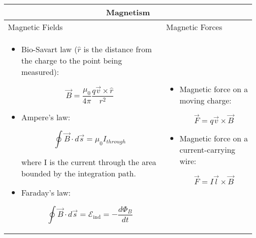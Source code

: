 \documentclass{article}
\begin{document}
\begin{center}

	\begin{longtable}{|p{9cm}|p{9cm}|}

		\hline

		\multicolumn{2}{|c|}{Magnetism}                                                                           \\

		\hline



		Magnetic Fields & Magnetic Forces                                                                         \\



		\begin{itemize}

			\item Bio-Savart law ($ \hat{r}$ is the distance from the charge to the point being measured):

			      \[ \vec{B} = \frac{\mu_0}{4\pi} \frac{q\vec{v} \times \hat{r}}{r^2} \]

			\item Ampere's law:

			      \[ \oint \vec{B} \cdot d \vec{s} = \mu_0 I_{through} \]

			      where I is the current through the area bounded by the integration path.



			\item Faraday's law:



			      \[ \oint \vec B \cdot d \vec s = \mathcal{E}_\text{ind} = - \frac{d \Phi_B}{dt} \]

		\end{itemize}



		                &



		\begin{itemize}

			\item Magnetic force on a moving charge:

			      \[ \vec{F} = q\vec{v} \times \vec{B} \]

			\item Magnetic force on a current-carrying wire:

			      \[ \vec{F} = I\vec{l} \times \vec{B} \]


\end{itemize}
\end{longtable}
\end{center}
\end{document}
